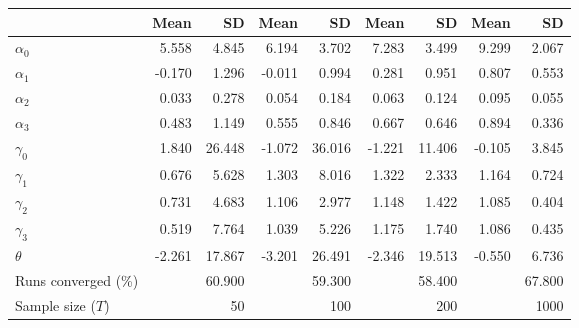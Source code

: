
\begin{tabular}[t]{lrrrrrrrr}
\toprule
  & Mean & SD & Mean  & SD  & Mean   & SD   & Mean    & SD   \\
\midrule
$\alpha_{0}$ & 5.558 & 4.845 & 6.194 & 3.702 & 7.283 & 3.499 & 9.299 & 2.067\\
$\alpha_{1}$ & -0.170 & 1.296 & -0.011 & 0.994 & 0.281 & 0.951 & 0.807 & 0.553\\
$\alpha_{2}$ & 0.033 & 0.278 & 0.054 & 0.184 & 0.063 & 0.124 & 0.095 & 0.055\\
$\alpha_{3}$ & 0.483 & 1.149 & 0.555 & 0.846 & 0.667 & 0.646 & 0.894 & 0.336\\
$\gamma_{0}$ & 1.840 & 26.448 & -1.072 & 36.016 & -1.221 & 11.406 & -0.105 & 3.845\\
$\gamma_{1}$ & 0.676 & 5.628 & 1.303 & 8.016 & 1.322 & 2.333 & 1.164 & 0.724\\
$\gamma_{2}$ & 0.731 & 4.683 & 1.106 & 2.977 & 1.148 & 1.422 & 1.085 & 0.404\\
$\gamma_{3}$ & 0.519 & 7.764 & 1.039 & 5.226 & 1.175 & 1.740 & 1.086 & 0.435\\
$\theta$ & -2.261 & 17.867 & -3.201 & 26.491 & -2.346 & 19.513 & -0.550 & 6.736\\
Runs converged (\%) &  & 60.900 &  & 59.300 &  & 58.400 &  & 67.800\\
Sample size ($T$) &  & 50 &  & 100 &  & 200 &  & 1000\\
\bottomrule
\end{tabular}
